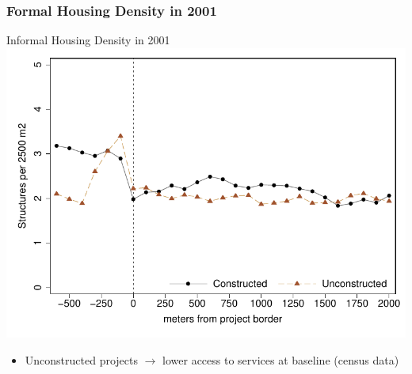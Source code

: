 \documentclass[aspectratio=32]{beamer}
\begin{document}
\begin{frame}
\frametitle{Formal Housing Density in 2001}
\centering
Informal Housing Density in 2001 \\
\vspace{.4cm} 
 \includegraphics[width=.71\textwidth,trim={.4cm .4cm .4cm .4cm}]{figures/bblu/bblu_inf_pre_means}\hspace{.5cm}
\begin{itemize}
  \item Unconstructed projects $\rightarrow$ lower access to services at baseline (census data)
\end{itemize}

\end{frame}





\end{document}
